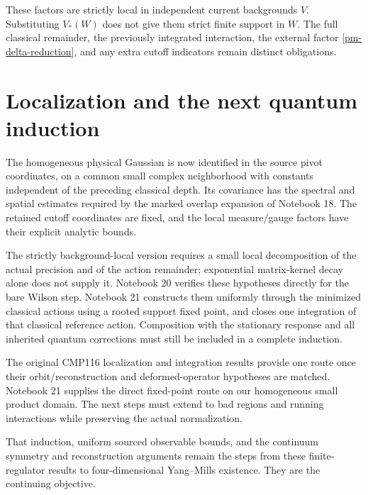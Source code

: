 \documentclass[11pt]{article}
\theoremstyle{remark}
\begin{document}
These factors are strictly local in independent current
backgrounds $V$. Substituting $V_*(W)$ does not give them
strict finite support in $W$. The full classical remainder,
the previously integrated interaction, the external factor
\eqref{pm-delta-reduction}, and any extra cutoff indicators
remain distinct obligations.

\section{Localization and the next quantum induction}
\label{ps19-next}

The homogeneous physical Gaussian is now identified in the source
pivot coordinates, on a common small complex neighborhood with
constants independent of the preceding classical depth. Its
covariance has the spectral and spatial estimates required by
the marked overlap expansion of Notebook 18. The retained
cutoff coordinates are fixed, and the local measure/gauge
factors have their explicit analytic bounds.

The strictly background-local version requires a small local
decomposition of the actual precision and of the action
remainder; exponential matrix-kernel decay alone does not
supply it. Notebook 20 verifies these hypotheses directly for
the bare Wilson step. Notebook 21 constructs them uniformly
through the minimized classical actions using a rooted support
fixed point, and closes one integration of that classical
reference action. Composition with the stationary response
and all inherited quantum corrections must still be included
in a complete induction.

The original CMP116 localization and integration results provide
one route once their orbit/reconstruction and deformed-operator
hypotheses are matched. Notebook 21 supplies the direct
fixed-point route on our homogeneous small product domain.
The next steps must extend to bad regions and running
interactions while preserving the actual normalization.

That induction, uniform sourced observable bounds, and the
continuum symmetry and reconstruction arguments remain the
steps from these finite-regulator results to four-dimensional
Yang--Mills existence. They are the continuing objective.
\end{document}
